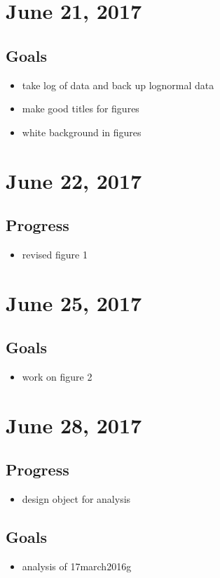 \documentclass{article}
\begin{document}
\section{June 21, 2017}
\subsection{Goals}
\begin{itemize}
  \item take log of data and back up lognormal data
  \item make good titles for figures
  \item white background in figures
\end{itemize}

\section{June 22, 2017}
\subsection{Progress}
\begin{itemize}
  \item revised figure 1
\end{itemize}

\section{June 25, 2017}
\subsection{Goals}
\begin{itemize}
  \item work on figure 2
\end{itemize}

\section{June 28, 2017}
\subsection{Progress}
\begin{itemize}
  \item design object for analysis
\end{itemize}

\subsection{Goals}
\begin{itemize}
  \item analysis of 17march2016g
\end{itemize}
\end{document}
